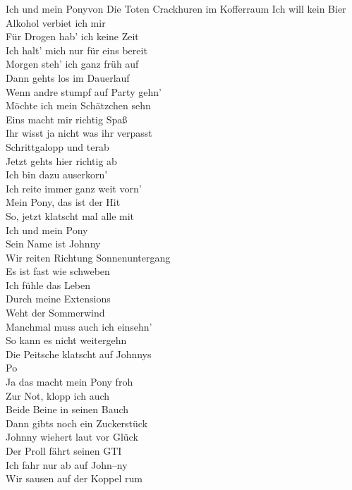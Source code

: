 
\begin{lied}{Ich und mein Pony}{von Die Toten Crackhuren im Kofferraum}
Ich will kein Bier\\
Alkohol verbiet ich mir\\
Für Drogen hab’ ich keine Zeit\\
Ich halt’ mich nur für eins bereit\\
Morgen steh’ ich ganz früh auf\\
Dann gehts los im Dauerlauf\\
Wenn andre stumpf auf Party gehn’\\
Möchte ich mein Schätzchen sehn\\
Eins macht mir richtig Spaß\\
Ihr wisst ja nicht was ihr verpasst\\
Schrittgalopp und terab\\
Jetzt gehts hier richtig ab\\
Ich bin dazu auserkorn’\\
Ich reite immer ganz weit vorn’\\
Mein Pony, das ist der Hit\\
So, jetzt klatscht mal alle mit\\
Ich und mein Pony\\
Sein Name ist Johnny\\
Wir reiten Richtung Sonnenuntergang\\
Es ist fast wie schweben\\
Ich fühle das Leben\\
Durch meine Extensions\\
Weht der Sommerwind\\
Manchmal muss auch ich einsehn’\\
So kann es nicht weitergehn\\
Die Peitsche klatscht auf Johnnys\\
Po\\
Ja das macht mein Pony froh\\
Zur Not, klopp ich auch\\
Beide Beine in seinen Bauch\\
Dann gibts noch ein Zuckerstück\\
Johnny wiehert laut vor Glück\\
Der Proll fährt seinen GTI\\
Ich fahr nur ab auf John–ny\\
Wir sausen auf der Koppel rum\\

\end{lied}
